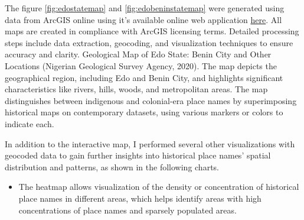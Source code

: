 The figure \ref{fig:edostatemap} and \ref{fig:edobeninstatemap} were generated using data from ArcGIS online using it's available online web application  \href{https://www.arcgis.com/apps/mapviewer/index.html}{here}. All maps are created in compliance with ArcGIS licensing terms.
Detailed processing steps include data extraction, geocoding, and visualization techniques to ensure accuracy and clarity. Geological Map of Edo State: Benin City and Other Locations (Nigerian Geological Survey Agency, 2020). The map depicts the geographical region, including Edo and Benin City, and highlights significant characteristics like rivers, hills, woods, and metropolitan areas. The map distinguishes between indigenous and colonial-era place names by superimposing historical maps on contemporary datasets, using various markers or colors to indicate each.

In addition to the interactive map, I performed several other visualizations with geocoded data to gain further insights into historical place names' spatial distribution and patterns, as shown in the following charts.

\begin{itemize}
    \item The heatmap allows visualization of the density or concentration of historical place names in different areas, which helps identify areas with high concentrations of place names and sparsely populated areas.
\end{itemize}


